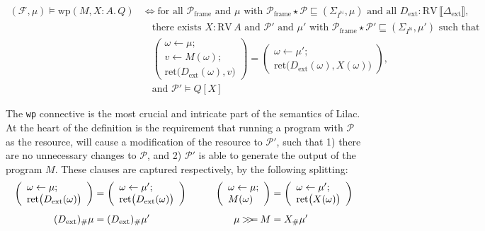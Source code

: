 \[
\begin{aligned}
(\mathcal{F},\mu) \vDash \mathrm{wp}(M,X\!:\!A.\,Q) &\iff \text{for all } \mathcal{P}_{\mathrm{frame}} \text{ and } \mu \text{ with } \mathcal{P}_{\mathrm{frame}}\star\mathcal{P} \sqsubseteq (\Sigma_{I^\mathbb{N}},\mu) \text{ and all } D_{\mathrm{ext}} : \mathrm{RV}\,\llbracket \Delta_{\mathrm{ext}} \rrbracket, \\
&\quad \text{there exists } X : \mathrm{RV}\,A \text{ and } \mathcal{P}' \text{ and } \mu' \text{ with } \mathcal{P}_{\mathrm{frame}}\star\mathcal{P}' \sqsubseteq (\Sigma_{I^\mathbb{N}},\mu') \text{ such that } \\
&\quad \left( \begin{array}{l} \omega \leftarrow \mu;\\ v \leftarrow M(\omega);\\ \mathrm{ret}\bigl(D_{\mathrm{ext}}(\omega),v\bigr) \end{array} \right) = \left( \begin{array}{l} \omega \leftarrow \mu';\\ \mathrm{ret}\bigl(D_{\mathrm{ext}}(\omega),X(\omega)\bigr) \end{array} \right), \\
&\quad \text{and } \mathcal{P}' \vDash Q[X]
\end{aligned}
\]

The \texttt{wp} connective is the most crucial and intricate part of the semantics of Lilac.
At the heart of the definition is the requirement that running a program with $\mathcal{P}$ as the resource, will cause a modification of the resource to $\mathcal{P'}$, such that
1) there are no unnecessary changes to $\mathcal{P}$, and 2) $\mathcal{P'}$ is able to generate the output of the program $M$.
These clauses are captured respectively, by the following splitting:
\begin{align}
\left(
\begin{array}{l}
\omega \leftarrow \mu;\\
\mathrm{ret}\bigl(D_{\mathrm{ext}}(\omega)\bigr)
\end{array}
\right)
&=
\left(
\begin{array}{l}
\omega \leftarrow \mu';\\
\mathrm{ret}\bigl(D_{\mathrm{ext}}(\omega)\bigr)
\end{array}
\right)
\qquad&
\left(
\begin{array}{l}
\omega \leftarrow \mu;\\
M(\omega)
\end{array}
\right)
&=
\left(
\begin{array}{l}
\omega \leftarrow \mu';\\
\mathrm{ret}\bigl(X(\omega)\bigr)
\end{array}
\right)
\label{eq:original}
\\[1ex]
(D_{\mathrm{ext}})_\#\mu
&=
(D_{\mathrm{ext}})_\#\mu'
\qquad&
\mu \mathbin{>\!\!>\mkern-6.7mu=} M
&=
X_\#\mu'
\label{eq:simplified}
\end{align}


